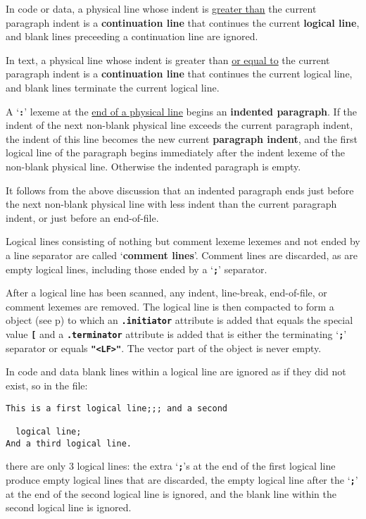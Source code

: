 \documentclass[12pt]{article}
\newcommand{\TT}[1]{{\tt \bfseries #1}}
\newcommand{\key}[1]{{\rm \bfseries #1}}
\newcommand{\pagref}[1]{p\pageref{#1}}
\newcommand{\DOLLAR}{\textdollar}
\newenvironment{indpar}[1][0.3in]%
	{\begin{list}{}%
		     {\setlength{\itemsep}{0in}%
		      \setlength{\topsep}{0in}%
		      \setlength{\parsep}{1ex}%
		      \setlength{\labelwidth}{#1}%
		      \setlength{\leftmargin}{#1}%
		      \addtolength{\leftmargin}{\labelsep}}%
	 \item}%
	{\end{list}}
\begin{document}
In code or data,
a physical line whose indent is \underline{greater than}
the current paragraph indent
is a \key{continuation line} that
continues the current \key{logical line}, and blank lines 
preceeding a continuation line are ignored.

In text,
a physical line whose indent is greater than \underline{or equal to}
the current paragraph indent
is a \key{continuation line} that
continues the current logical line, and blank lines 
terminate the current logical line.

A `\TT{:}'
lexeme at the \underline{end of a physical line} begins an
\key{indented paragraph}.  If the indent of the next non-blank
physical line exceeds the current paragraph indent, the indent of this
line becomes the new current \key{paragraph indent}, and the first
logical line of the paragraph begins immediately after the indent lexeme
of the non-blank physical line.  Otherwise the
indented paragraph is empty.

It follows from the above discussion that an indented paragraph ends
just before the next
non-blank physical line with less indent than the
current paragraph indent, or just before an end-of-file.

Logical lines consisting of nothing but comment lexeme lexemes and not
ended by a line separator are
called `\key{comment lines}'.  Comment lines are discarded,
as are empty logical lines, including those ended by a `\TT{;}' separator.

After a logical
line has been scanned, any indent, line-break, end-of-file,
or comment lexemes
are removed.  The logical line is then compacted to form
a object (see \pagref{OBJECT}) to which an \TT{.initiator}
attribute is added that equals
the special value \TT[\DOLLAR{ LOGICAL\_LINE \DOLLAR]} and a
\TT{.terminator} attribute is added that is either the terminating 
`\TT{;}' separator or equals \TT{"<LF>"}.  The vector part of the
object is never empty.

In code and data blank lines within a logical line
are ignored
as if they did not exist, so in the file:
\begin{indpar}\begin{verbatim}
This is a first logical line;;; and a second

  logical line;
And a third logical line.
\end{verbatim}\end{indpar}
there are only 3 logical lines: the extra `\TT{;}'s at the
end of the first logical line produce empty logical lines that
are discarded, the empty logical line after the `\TT{;}' at the
end of the second logical line is ignored, and the blank line within
the second logical line is ignored.
\end{document}
